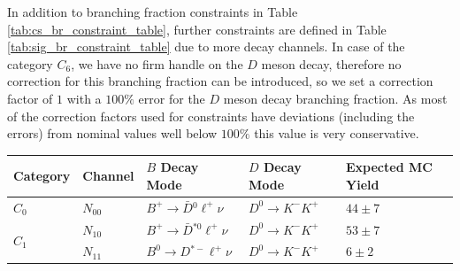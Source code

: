 In addition to branching fraction constraints in Table \ref{tab:cs_br_constraint_table}, further constraints are defined in Table \ref{tab:sig_br_constraint_table} due to more decay channels. In case of the category $C_6$, we have no firm handle on the $D$ meson decay, therefore no correction for this branching fraction can be introduced, so we set a correction factor of $1$ with a $100\%$ error for the $D$ meson decay branching fraction. As most of the correction factors used for constraints have deviations (including the errors) from nominal values well below $100\%$ this value is very conservative.


\begin{table}[H]
	\centering
	\begin{tabular}{l|l|l|l|l}
		Category & Channel & $B$ Decay Mode & $D$ Decay Mode & Expected MC Yield \\
		\toprule
		
		$C_0$ & $N_{00}$ &  $B^+ \to \bar D {}^{0} \ell^+ \nu$ & $D^0 \to K^-K^+$ & $44\pm7$\\
		\midrule
		
		\multirow{2}{*}{$C_1$} & $N_{10}$ & $B^+ \to \bar D {}^{*0} \ell^+ \nu$ & $D^0 \to K^-K^+$ & $53\pm7$\\
		& $N_{11}$ & $B^0 \to D {}^{*-} \ell^+ \nu$  & $D^0 \to K^-K^+$ & $6\pm2$\\
		\midrule
		

\end{tabular}
\end{table}
